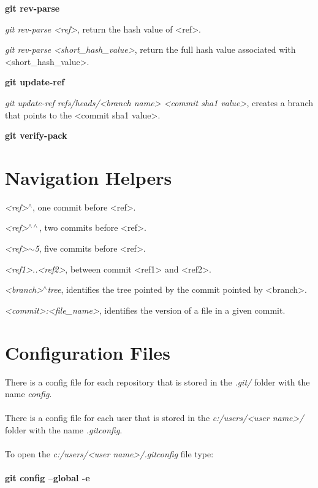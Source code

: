 \begin{refsection}
\vspace*{5mm} \vspace*{5mm} \noindent \textbf{git rev-parse}

\noindent \emph{git rev-parse <ref>}, return the hash value of <ref>.

\noindent \emph{git rev-parse <short\_hash\_value>}, return the full hash value associated with <short\_hash\_value>.


\vspace*{5mm} \noindent \textbf{git update-ref}

\noindent \emph{git update-ref refs/heads/<branch name> <commit sha1 value>}, creates a branch that points to the <commit sha1 value>.

\vspace*{5mm} \noindent \textbf{git verify-pack}

\section{Navigation Helpers}

\noindent \emph{<ref>$^{\wedge}$}, one commit before <ref>.

\noindent \emph{<ref>$^{\wedge \wedge}$}, two commits before <ref>.

\noindent \emph{<ref>$\sim$5}, five commits before <ref>.

\noindent \emph{<ref1>..<ref2>}, between commit <ref1> and <ref2>.

\noindent \emph{<branch>$^{\wedge}${tree}}, identifies the tree pointed by the commit pointed by <branch>.

\noindent \emph{<commit>:<file\_name>}, identifies the version of a file in a given commit.

\section{Configuration Files}

There is a config file for each repository that is stored in the \emph{.git/} folder with the name \emph{config}.\\
\\
There is a config file for each user that is stored in the \emph{c:/users/<user name>/} folder with the name \emph{.gitconfig}.\\
\\
To open the \emph{c:/users/<user name>/.gitconfig} file type:\\
\\
\textbf{git config --global -e}


\end{refsection}
